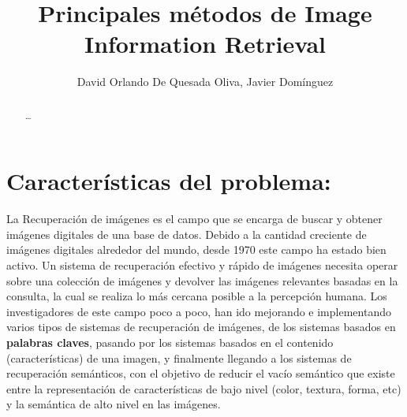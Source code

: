 \documentclass{llncs}
\begin{document}
\frontmatter          %
%


\tableofcontents
%
\mainmatter              %
%
\title{Principales m\'etodos de Image Information Retrieval}
%
\titlerunning{}  %
%

%
\author{David Orlando De Quesada Oliva, Javier Dom\'inguez}
%
%

%
\begin{abstract}
    \dots
   \keywords{}
   \end{abstract}


\maketitle

\section{Caracter\'isticas del problema:}

La Recuperación de im\'agenes es el campo que se encarga de buscar y obtener imágenes 
digitales de una base  de datos. Debido a la cantidad creciente de imágenes digitales 
alrededor del mundo, desde 1970 este campo ha estado bien activo. Un sistema de 
recuperación efectivo y rápido de imágenes necesita operar sobre una colección de 
imágenes y devolver las imágenes relevantes basadas en la consulta, la cual 
se realiza lo más cercana posible a la percepción humana. Los investigadores de este 
campo poco a poco, han ido mejorando e implementando varios tipos de sistemas de recuperación 
de imágenes, de los sistemas basados en \textbf{palabras claves}, pasando por los sistemas 
basados en el contenido (características) de una imagen, y finalmente llegando a los 
sistemas de recuperación semánticos, con el objetivo de reducir el vacío semántico que 
existe entre la representación de características de bajo nivel (color, textura, forma, etc) y 
la semántica de alto nivel en las imágenes.
\end{document}
